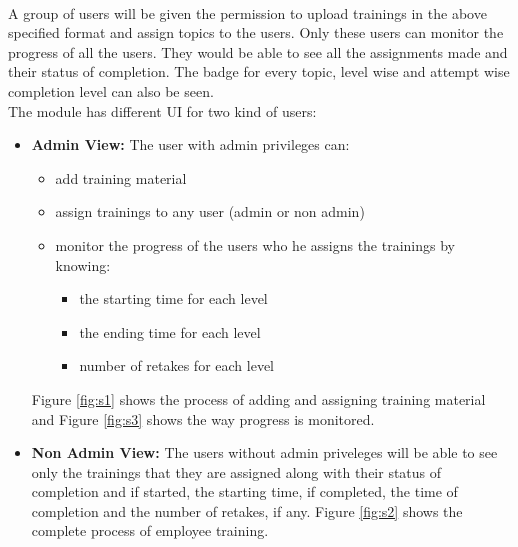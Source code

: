 \documentclass[a4paper,11pt]{article}
\begin{document}
\medskip\\
A group of users will be given the permission to upload trainings in the above specified format and assign topics to the users. Only these users can monitor the progress of all the users. They would be able to see all the assignments made and their status of completion. The badge for every topic, level wise and attempt wise completion level can also be seen.
\medskip\\
The module has different UI for two kind of users:
\begin{itemize}
    \item \textbf{Admin View: }The user with admin privileges can:
    \begin{itemize}
        \item add training material
        \item assign trainings to any user (admin or non admin)
        \item monitor the progress of the users who he assigns the trainings by knowing:
        \begin{itemize}
            \item the starting time for each level
            \item the ending time for each level
            \item number of retakes for each level
        \end{itemize}
    \end{itemize}
    Figure \ref{fig:s1} shows the process of adding and assigning training material and Figure \ref{fig:s3} shows the way progress is monitored.
    \item \textbf{Non Admin View: }The users without admin priveleges will be able to see only the trainings that they are assigned along with their status of completion and if started, the starting time, if completed, the time of completion and the number of retakes, if any. Figure \ref{fig:s2} shows the complete process of employee training.
\end{itemize}
\end{document}
